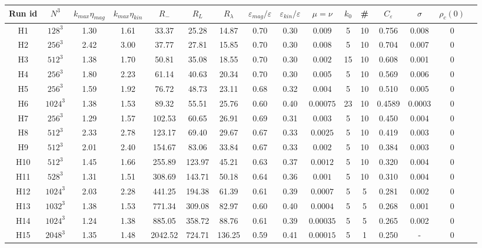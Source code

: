\documentclass[aps,pre,onecolumn,superscriptaddress,notitlepage]{revtex4-1}
\newcommand{\Ceps}{C_\varepsilon}
\newcommand{\Rl}{R_{\lambda}}
\newcommand{\vep}{\varepsilon}
\begin{document}
 \begin{table}[]
 \begin{center}
 \begin{tabular}{cccccccccccccccc}
   Run id & $N^3$  & $k_{max}\eta_{mag}$ & $k_{max}\eta_{kin}$& $R_{-}$ & $R_L$ & $\Rl$ & $\vep_{mag}/\vep$ & $\vep_{kin}/\vep$ & $\mu=\nu $  & $k_{0}$ & \#  & $\Ceps$
  & $\sigma$ & $\rho_c(0)$ \\
  \hline
   H1 & $128^3$ & 1.30 & 1.61 & 33.37 & 25.28 & 14.87 & 0.70 & 0.30 & $0.009$ & 5 & 10 & 0.756 & 0.008 & 0\\
  H2 & $256^3$ & 2.42 & 3.00 & 37.77 & 27.81 & 15.85 & 0.70 & 0.30 & $0.008$ &  5 & 10 & 0.704  & 0.007 & 0\\
  H3 & $512^3$ & 1.38 & 1.70  & 50.81 & 35.08 & 18.55 & 0.70 & 0.30 & $0.002$  & 15 & 10  & 0.608 & 0.001 & 0 \\
  H4 & $256^3$ & 1.80 & 2.23 & 61.14 & 40.63 & 20.34 & 0.70 & 0.30 & 0.005  &  5 & 10 & 0.569 & 0.006 & 0 \\
  H5 & $256^3$ & 1.59 & 1.92 & 76.72 & 48.73 & 23.11 & 0.68 & 0.32 & 0.004 &  5 & 10 & 0.510 & 0.005 & 0\\
  H6 & $1024^3$ & 1.38 & 1.53 & 89.32 &55.51 & 25.76 & 0.60 & 0.40 & $0.00075$  & 23 & 10 & 0.4589 & 0.0003 & 0\\
  H7 & $256^3$ & 1.29 & 1.57 & 102.53 & 60.65 & 26.91 & 0.69& 0.31 & $0.003$ & 5 & 10 & 0.450 & 0.004 & 0\\
  H8 & $512^3$ & 2.33 & 2.78 & 123.17 & 69.40 & 29.67 & 0.67 & 0.33 & $0.0025$ & 5 & 10 & 0.419 & 0.003 & 0\\
  H9 & $512^3$ & 2.01 & 2.40 & 154.67 & 83.06 & 33.84 & 0.67 & 0.33& $0.002$ & 5 & 10 & 0.384 & 0.003 & 0\\
  H10 & $512^3$ & 1.45 & 1.66 & 255.89 & 123.97 & 45.21 & 0.63 & 0.37 & $0.0012$ & 5 & 10 & 0.320 & 0.004 &0\\
  H11 & $528^3$ & 1.31 & 1.51 & 308.69 & 143.71 & 50.18 & 0.64  & 0.36& $0.001$ & 5 & 10 & 0.310 & 0.004& 0\\
  H12 & $1024^3$ & 2.03 & 2.28 & 441.25 & 194.38 & 61.39 & 0.61 & 0.39& $0.0007$  & 5 & 5 & 0.281 & 0.002 & 0\\
  H13 & $1032^3$ & 1.38 & 1.53 & 771.34 & 309.08 & 82.97 & 0.60 & 0.40& $0.0004$  & 5 & 5 & 0.268 & 0.001 & 0\\
  H14 & $1024^3$ & 1.24 & 1.38 & 885.05 & 358.72 & 88.76 & 0.61 & 0.39& $0.00035$  & 5 & 5 & 0.265 & 0.002 & 0\\
  H15 & $2048^3$ & 1.35 & 1.48 & 2042.52 & 724.71 & 136.25 & 0.59& 0.41& $0.00015$  & 5 & 1 & 0.250 & - & 0\\

\end{tabular}
\end{center}
\end{table}
\end{document}
